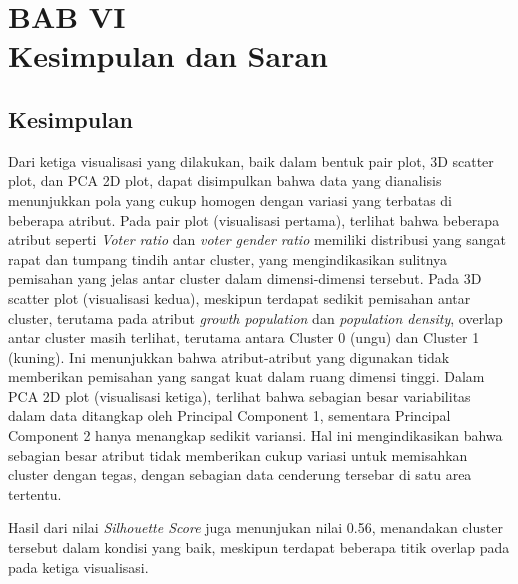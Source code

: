 \newpage
\section*{\centering BAB VI \\ Kesimpulan dan Saran }


\setcounter{section}{6}
\setcounter{subsection}{0}  %
\setcounter{figure}{0}
\setcounter{table}{0}
\setcounter{lstlisting}{0}
\renewcommand{\thetable}{\thesection.\arabic{table}}
\renewcommand{\thefigure}{\thesection.\arabic{figure}}
\renewcommand{\thelstlisting}{\thesection.\arabic{lstlisting}}

\subsection{Kesimpulan}
Dari ketiga visualisasi yang dilakukan, baik dalam bentuk pair plot, 3D scatter plot, dan PCA 2D plot, dapat disimpulkan bahwa data yang dianalisis menunjukkan pola yang cukup homogen dengan variasi yang terbatas di beberapa atribut. Pada pair plot (visualisasi pertama), terlihat bahwa beberapa atribut seperti \textit{Voter ratio} dan \textit{voter gender ratio} memiliki distribusi yang sangat rapat dan tumpang tindih antar cluster, yang mengindikasikan sulitnya pemisahan yang jelas antar cluster dalam dimensi-dimensi tersebut. Pada 3D scatter plot (visualisasi kedua), meskipun terdapat sedikit pemisahan antar cluster, terutama pada atribut \textit{growth population} dan \textit{population density}, overlap antar cluster masih terlihat, terutama antara Cluster 0 (ungu) dan Cluster 1 (kuning). Ini menunjukkan bahwa atribut-atribut yang digunakan tidak memberikan pemisahan yang sangat kuat dalam ruang dimensi tinggi. Dalam PCA 2D plot (visualisasi ketiga), terlihat bahwa sebagian besar variabilitas dalam data ditangkap oleh Principal Component 1, sementara Principal Component 2 hanya menangkap sedikit variansi. Hal ini mengindikasikan bahwa sebagian besar atribut tidak memberikan cukup variasi untuk memisahkan cluster dengan tegas, dengan sebagian data cenderung tersebar di satu area tertentu.

Hasil dari nilai \textit{Silhouette Score} juga menunjukan nilai 0.56, menandakan cluster tersebut dalam kondisi yang baik, meskipun terdapat beberapa titik overlap pada pada ketiga visualisasi. 

